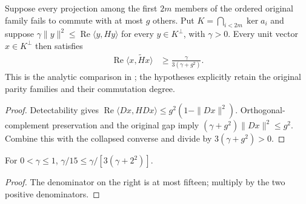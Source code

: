 \begin{lemma}
    \label{thm:alvv_ff_collapsed_gap}
    \leanok
    Suppose every projection among the first $2m$ members of the
    ordered original family fails to commute with at most $g$ others.
    Put $K=\bigcap_{i<2m}\ker a_i$ and suppose
    $\gamma\|y\|^2\le\operatorname{Re}\langle y,Hy\rangle$
    for every $y\in K^\perp$, with $\gamma>0$.
    Every unit vector $x\in K^\perp$ then satisfies
    \begin{align}
        \operatorname{Re}\langle x,\widetilde Hx\rangle
         & \ge\frac{\gamma}{3(\gamma+g^2)}.
        \label{eq:alvv_ff_collapsed_gap}
    \end{align}
    This is the analytic comparison in
    \cite[Theorem~5.14(3)]{Arad2016RigorousRG}; the hypotheses explicitly
    retain the original parity families and their commutation degree.
\end{lemma}
\begin{proof}\leanok
    Detectability gives
    $\operatorname{Re}\langle Dx,HDx\rangle\le g^2(1-\|Dx\|^2)$.
    Orthogonal-complement preservation and the original gap imply
    $(\gamma+g^2)\|Dx\|^2\le g^2$.
    Combine this with the collapsed converse and divide by
    $3(\gamma+g^2)>0$.
\end{proof}

\begin{lemma}
    \label{cor:alvv_ff_gap_ratio}
    \leanok
    For $0<\gamma\le1$,
    $\gamma/15\le\gamma/[3(\gamma+2^2)]$.
\end{lemma}
\begin{proof}\leanok
    The denominator on the right is at most fifteen; multiply by the
    two positive denominators.
\end{proof}

